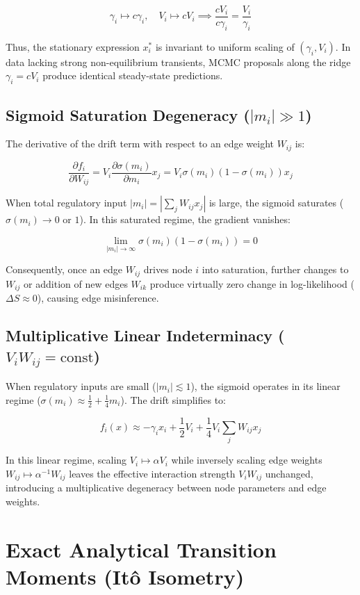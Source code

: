 \documentclass[11pt,onecolumn]{article}
\theoremstyle{definition}
\theoremstyle{remark}
\begin{document}
$$\gamma_i \mapsto c \gamma_i, \quad V_i \mapsto c V_i \implies \frac{cV_i}{c\gamma_i} = \frac{V_i}{\gamma_i}$$

Thus, the stationary expression $x_i^*$ is invariant to uniform scaling of $(\gamma_i, V_i)$. In data lacking strong non-equilibrium transients, MCMC proposals along the ridge $\gamma_i = c V_i$ produce identical steady-state predictions.

\subsection{Sigmoid Saturation Degeneracy ($|m_i| \gg 1$)}

The derivative of the drift term with respect to an edge weight $W_{ij}$ is:

$$\frac{\partial f_i}{\partial W_{ij}} = V_i \frac{\partial \sigma(m_i)}{\partial m_i} x_j = V_i \sigma(m_i)\left(1 - \sigma(m_i)\right) x_j$$

When total regulatory input $|m_i| = \left|\sum_j W_{ij} x_j\right|$ is large, the sigmoid saturates ($\sigma(m_i) \to 0$ or $1$). In this saturated regime, the gradient vanishes:

$$\lim_{|m_i| \to \infty} \sigma(m_i)(1 - \sigma(m_i)) = 0$$

Consequently, once an edge $W_{ij}$ drives node $i$ into saturation, further changes to $W_{ij}$ or addition of new edges $W_{ik}$ produce virtually zero change in log-likelihood ($\Delta S \approx 0$), causing edge misinference.

\subsection{Multiplicative Linear Indeterminacy ($V_i W_{ij} = \text{const}$)}

When regulatory inputs are small ($|m_i| \lesssim 1$), the sigmoid operates in its linear regime ($\sigma(m_i) \approx \frac{1}{2} + \frac{1}{4} m_i$). The drift simplifies to:

$$f_i(x) \approx -\gamma_i x_i + \frac{1}{2} V_i + \frac{1}{4} V_i \sum_j W_{ij} x_j$$

In this linear regime, scaling $V_i \mapsto \alpha V_i$ while inversely scaling edge weights $W_{ij} \mapsto \alpha^{-1} W_{ij}$ leaves the effective interaction strength $V_i W_{ij}$ unchanged, introducing a multiplicative degeneracy between node parameters and edge weights.

\section{Exact Analytical Transition Moments (Itô Isometry)}
\end{document}

